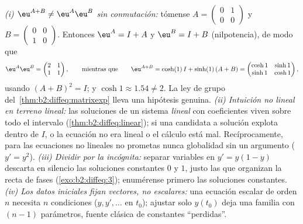 \begin{remark}
\emph{(i) $\eu^{A+B} \neq \eu^A\eu^B$ sin conmutación:} tómense $A =
\begin{pmatrix} 0 & 1\\ 0 & 0\end{pmatrix}$ y $B = \begin{pmatrix} 0
& 0\\ 1 & 0\end{pmatrix}$. Entonces $\eu^A = I + A$ y $\eu^B = I + B$
(nilpotencia), de modo que
\[
\eu^A\eu^B = \begin{pmatrix} 2 & 1\\ 1 & 1\end{pmatrix},
\qquad\text{mientras que}\qquad
\eu^{A+B} = \cosh(1)\,I + \sinh(1)\,(A + B)
= \begin{pmatrix} \cosh 1 & \sinh 1\\ \sinh 1 & \cosh 1
\end{pmatrix},
\]
usando $(A+B)^2 = I$; y $\cosh 1 \approx 1.54 \neq 2$. La ley de
grupo del~\cref{thm:b2:diffeq:matrixexp} lleva una hipótesis genuina.
\emph{(ii) Intuición no lineal en terreno lineal:} las soluciones de
un sistema \emph{lineal} con coeficientes  viven sobre todo
el intervalo (\cref{thm:b2:diffeq:linear}); si una candidata a
solución explota dentro de $I$, o la ecuación no era lineal o el
cálculo está mal. Recíprocamente, para las ecuaciones no lineales no
prometas nunca globalidad sin un argumento ($y' = y^2$).
\emph{(iii) Dividir por la incógnita:} separar variables en $y' =
y(1-y)$ descarta en silencio las soluciones constantes $0$ y $1$,
justo las que organizan la recta de fases
(\cref{exo:b2:diffeq:3}); enumérense primero las soluciones
constantes. \emph{(iv) Los datos iniciales fijan vectores, no
escalares:} una ecuación escalar de orden $n$ necesita $n$
condiciones ($y, y', \dots$ en $t_0$); ajustar solo $y(t_0)$ deja una
familia con $(n-1)$ parámetros, fuente clásica de constantes
``perdidas''.
\end{remark}

